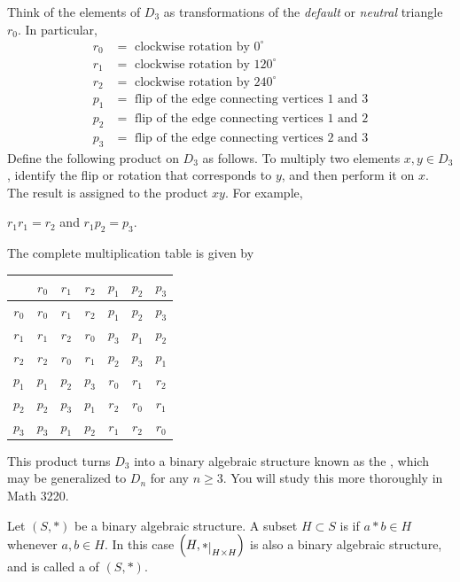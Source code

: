 \documentclass[11pt,fleqn,dvipsnames,usenames]{article}
\newcommand{\p}{\noindent}
\begin{document}
\begin{examples}
\begin{enumerate}[(a)]
\p Think of the elements of $D_3$ as transformations of the \emph{default} or \emph{neutral} triangle $r_{0}$.  In particular,
\begin{align*}
r_0 &= \text{ clockwise rotation by }0^{\circ}\\
r_1 &= \text{ clockwise rotation by }120^{\circ}\\
r_2 &= \text{ clockwise rotation by }240^{\circ}\\
p_1 &= \text{ flip of the edge connecting vertices }1\text{ and }3\\
p_2 &= \text{ flip of the edge connecting vertices }1\text{ and }2\\
p_3 &= \text{ flip of the edge connecting vertices }2\text{ and }3
\end{align*}
\p Define the following product on $D_{3}$ as follows.  To multiply two elements $x,y\in D_3$, identify the flip or rotation that corresponds to $y$, and then perform it on $x$.  The result is assigned to the product $xy$.  For example,
\begin{center}
$r_{1}r_{1} = r_{2}$ and $r_{1}p_{2} = p_{3}$.
\end{center}
\p The complete multiplication table is given by
\bgroup
\begin{center}
\def\arraystretch{1.5}
\begin{tabular}{c|cccccc}
 & $r_{0}$ & $r_{1}$ & $r_{2}$ & $p_{1}$ & $p_{2}$ & $p_{3}$\\
\hline
$r_{0}$ & $r_{0}$ & $r_{1}$ & $r_{2}$ & $p_{1}$ & $p_{2}$ & $p_{3}$\\
$r_{1}$ & $r_{1}$ & $r_{2}$ & $r_{0}$ & $p_{3}$ & $p_{1}$ & $p_{2}$\\
$r_{2}$ & $r_{2}$ & $r_{0}$ & $r_{1}$ & $p_{2}$ & $p_{3}$ & $p_{1}$\\
$p_{1}$ & $p_{1}$ & $p_{2}$ & $p_{3}$ & $r_{0}$ & $r_{1}$ & $r_{2}$\\
$p_{2}$ & $p_{2}$ & $p_{3}$ & $p_{1}$ & $r_{2}$ & $r_{0}$ &$r_{1}$\\
$p_{3}$ & $p_{3}$ & $p_{1}$ & $p_{2}$ & $r_{1}$ & $r_{2}$ & $r_{0}$
\end{tabular}
\end{center}
\egroup
\p This product turns $D_{3}$ into a binary algebraic structure known as the , which may be generalized to $D_n$ for any $n\geq 3$.  You will study this more thoroughly in Math 3220.  
\end{enumerate}
\end{examples}
%
\begin{definition}
Let $(S,*)$ be a binary algebraic structure.  A subset $H\subset S$ is  if $a*b\in H$ whenever $a,b\in H$.  In this case $\left(H,*\restrict{H\times H}\right)$ is also a binary algebraic structure, and is called a  of $(S,*)$.
\end{definition}
\end{document}
